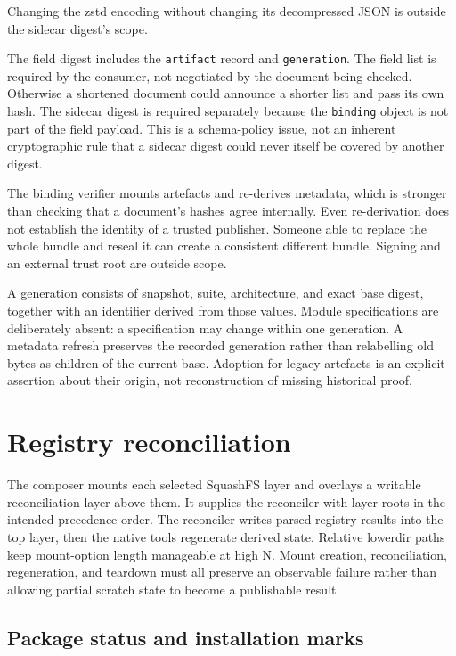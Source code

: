 Changing the zstd encoding without changing its decompressed \ac{JSON} is outside the sidecar digest's scope.

The field digest includes the \texttt{artifact} record and \texttt{generation}. The field list is required by the consumer, not negotiated by the document being checked. Otherwise a shortened document could announce a shorter list and pass its own hash. The sidecar digest is required separately because the \texttt{binding} object is not part of the field payload. This is a schema-policy issue, not an inherent cryptographic rule that a sidecar digest could never itself be covered by another digest.

The binding verifier mounts artefacts and re-derives metadata, which is stronger than checking that a document's hashes agree internally. Even re-derivation does not establish the identity of a trusted publisher. Someone able to replace the whole bundle and reseal it can create a consistent different bundle. Signing and an external trust root are outside scope.

A generation consists of snapshot, suite, architecture, and exact base digest, together with an identifier derived from those values. Module specifications are deliberately absent: a specification may change within one generation. A metadata refresh preserves the recorded generation rather than relabelling old bytes as children of the current base. Adoption for legacy artefacts is an explicit assertion about their origin, not reconstruction of missing historical proof.

\section{Registry reconciliation}
\label{sec:arch:registries}

The composer mounts each selected SquashFS layer and overlays a writable reconciliation layer above them. It supplies the reconciler with layer roots in the intended precedence order. The reconciler writes parsed registry results into the top layer, then the native tools regenerate derived state. Relative lowerdir paths keep mount-option length manageable at high N. Mount creation, reconciliation, regeneration, and teardown must all preserve an observable failure rather than allowing partial scratch state to become a publishable result.

\subsection{Package status and installation marks}
\label{sec:arch:status}

